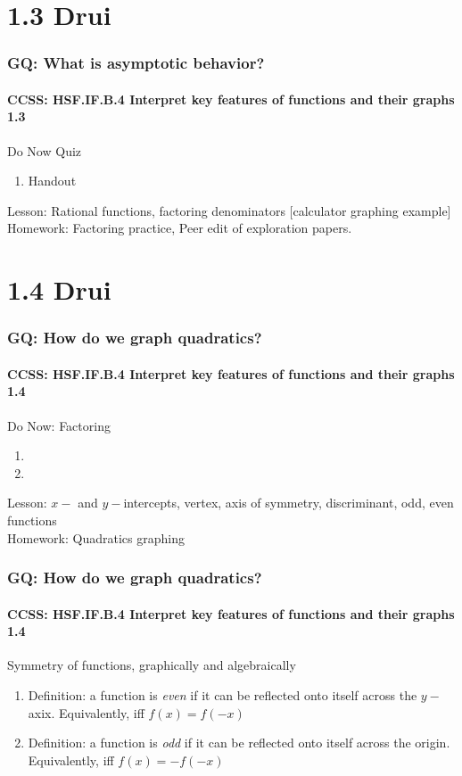 \documentclass{beamer}
\begin{document}
  \section{1.3 Drui}
  \frame
  {
    \frametitle{GQ: What is asymptotic behavior?}
    \framesubtitle{CCSS: HSF.IF.B.4 Interpret key features of functions and their graphs \qquad \alert{1.3}}

    \begin{block}{Do Now Quiz}
    \begin{enumerate}
        \item Handout
    \end{enumerate}
    \end{block}
    Lesson: Rational functions, factoring denominators [calculator graphing example]
    \\%
    Homework: Factoring practice, Peer edit of exploration papers.
  }

  \section{1.4 Drui}
  \frame
  {
    \frametitle{GQ: How do we graph quadratics?}
    \framesubtitle{CCSS: HSF.IF.B.4 Interpret key features of functions and their graphs \qquad \alert{1.4}}

    \begin{block}{Do Now: Factoring}
    \begin{enumerate}
        \item
        \item
    \end{enumerate}
    \end{block}
    Lesson: $x-$ and $y-$intercepts, vertex, axis of symmetry, discriminant, odd, even functions
    \\%
    Homework: Quadratics graphing
  }

  \frame
  {
    \frametitle{GQ: How do we graph quadratics?}
    \framesubtitle{CCSS: HSF.IF.B.4 Interpret key features of functions and their graphs \qquad \alert{1.4}}

    \begin{block}{Symmetry of functions, graphically and algebraically}
    \begin{enumerate}
        \item Definition: a function is \emph{even} if it can be reflected onto itself across the $y-$axix. Equivalently, iff $f(x)=f(-x)$
        \item Definition: a function is \emph{odd} if it can be reflected onto itself across the origin. Equivalently, iff $f(x)=-f(-x)$
    \end{enumerate}
    \end{block}
  }
\end{document}
